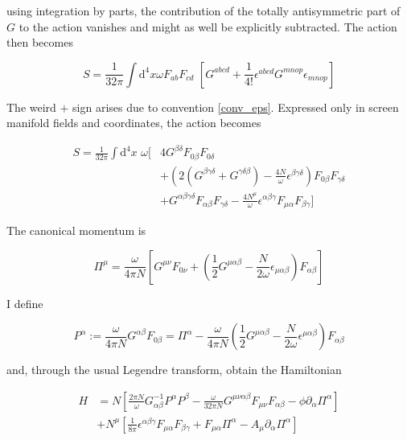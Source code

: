 \documentclass[11pt]{article}
\begin{document}
using integration by parts, the contribution of the totally antisymmetric part of $G$ to the action vanishes and might as well be explicitly subtracted. The action then becomes

\begin{equation} 
	S = \frac{1}{32 \pi} \int \mathrm{d}^4 x \omega F_{a b} F_{c d} \, \,
	\left[ G^{a b c d} + \frac{1}{4!} \epsilon^{a b c d} G^{m n o p} \epsilon_{m n o p}
	\right]
\end{equation}

The weird $+$ sign arises due to convention \ref{conv_eps}. Expressed only in screen manifold fields and coordinates, the action becomes

\begin{equation} 
\begin{split}
	S = \frac{1}{32 \pi} \int \mathrm{d}^4 x \,\,\omega 
	[ 
	&4 G^{\beta \delta} F_{0 \beta} F_{0 \delta} \\
	&+ \left( 
	2 \left( G^{\beta \gamma \delta} + G^{ \gamma \delta \beta} \right)
	- \frac{4 N}{\omega} \epsilon^{\beta \gamma \delta}
	\right) F_{0 \beta} F_{\gamma \delta}\\
	&+ G^{\alpha \beta \gamma \delta} F_{\alpha \beta} F_{\gamma \delta}
	-  \frac{4 N^\mu}{\omega} 
	\epsilon^{\alpha \beta \gamma} F_{\mu \alpha} F_{\beta \gamma}
	]
\end{split}
\end{equation}

The canonical momentum is

\begin{equation}
	\Pi^\mu = \frac{\omega}{4 \pi N} 
	\left[ G^{\mu \nu} F_{0 \nu}
	+ \left( \frac{1}{2} G^{ \mu \alpha \beta} 
	- \frac{N}{2 \omega} \epsilon_{ \mu \alpha \beta}
	\right)
	F_{\alpha \beta}
	\right]
\end{equation}

I define 

\begin{equation}
	P^\alpha :=
	\frac{\omega}{4 \pi N} G^{\alpha \beta} F_{0 \beta}
	= \Pi^\alpha 
	- \frac{\omega}{4 \pi N} 
	\left( 
	\frac{1}{2} G^{\mu \alpha \beta} 
	- \frac{N}{2 \omega} \epsilon^{\mu \alpha \beta}
	\right)
	F_{\alpha \beta}
\end{equation}

and, through the usual Legendre transform, obtain the Hamiltonian 

\begin{equation}
	\begin{split}
		H &= N
		\left[
		\frac{2 \pi N}{\omega} G^{-1}_{\alpha \beta} P^\alpha P^\beta
		- \frac{\omega}{32 \pi N} G^{\mu \nu \alpha \beta} F_{\mu \nu} F_{\alpha \beta}
		- \phi \partial_\alpha \Pi^\alpha
		\right]\\
		&+ N^\mu
		\left[
		\frac{1}{8 \pi} \epsilon^{\alpha \beta \gamma} F_{\mu \alpha} F_{\beta \gamma} 
		+ F_{\mu \alpha} \Pi^{\alpha} - A_\mu \partial_\alpha \Pi^\alpha
		\right]
	\end{split}
\end{equation}
\end{document}
